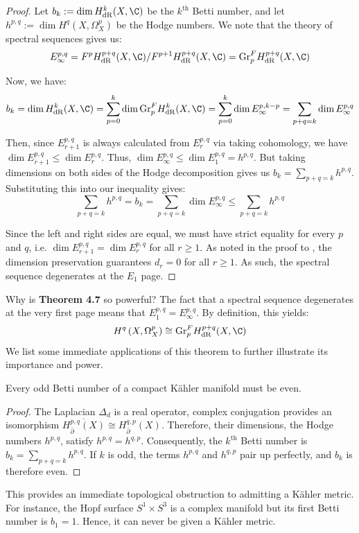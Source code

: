 \begin{proof}
        Let $b_k:=\dim H_\mathrm{dR}^k(X,\C)$ be the $k^\text{th}$ Betti number, and let $h^{p,q}:=\dim H^q\left(X,\Omega_X^p\right)$ be the Hodge numbers. We note that the theory of spectral sequences gives us:
        $$
        E_\infty^{p,q} = F^p H_\mathrm{dR}^{p+q}(X,\C) / F^{p+1} H_\mathrm{dR}^{p+q}(X,\C) = \mathrm{Gr}^F_p H_\mathrm{dR}^{p+q}(X,\C)
        $$
        
        \noindent Now, we have:
        $$
        b_k = \dim H_\mathrm{dR}^k(X,\C) = \sum_{p=0}^k\dim \mathrm{Gr}^F_p H_\mathrm{dR}^k(X,\C) = \sum_{p=0}^k\dim E^{p,k-p}_\infty = \sum_{p+q=k} \dim E_\infty^{p,q}
        $$
        
        \noindent Then, since $E_{r+1}^{p,q}$ is always calculated from $E_r^{p,q}$ via taking cohomology, we have $\dim E_{r+1}^{p,q} \leq \dim E_r^{p,q}$. Thus, $\dim E_\infty^{p,q} \leq \dim E_1^{p,q} = h^{p,q}$. But taking dimensions on both sides of the Hodge decomposition gives us $b_k = \sum_{p+q=k} h^{p,q}$. Substituting this into our inequality gives:
        $$
        \sum_{p+q=k} h^{p,q} = b_k = \sum_{p+q=k} \dim E_\infty^{p,q} \leq \sum_{p+q=k} h^{p,q}
        $$
        
        \noindent Since the left and right sides are equal, we must have strict equality for every $p$ and $q$, i.e. $\dim E_{r+1}^{p,q} = \dim E_r^{p,q}$ for all $r\geq 1$. As noted in the proof to \cite[Theorem 8.28]{VoisinI2002}, the dimension preservation guarantees $d_r = 0$ for all $r\geq 1$. As such, the spectral sequence degenerates at the $E_1$ page.
\end{proof}

\noindent Why is \textbf{Theorem 4.7} so powerful? The fact that a spectral sequence degenerates at the very first page means that $E_1^{p,q} = E_\infty^{p,q}$. By definition, this yields:
$$
H^q\left(X,\Omega_X^p\right) \cong \mathrm{Gr}^F_p H^{p+q}_\mathrm{dR}(X,\C)
$$
We list some immediate applications of this theorem to further illustrate its importance and power. 

\begin{corollary}
    Every odd Betti number of a compact K\"ahler manifold must be even.
\end{corollary}

\begin{proof}
    The Laplacian $\Delta_d$ is a real operator, complex conjugation provides an isomorphism $\overline{H_{\bar{\partial}}^{p,q}(X)} \cong H_{\bar{\partial}}^{q,p}(X)$. Therefore, their dimensions, the Hodge numbers $h^{p,q}$, satisfy $h^{p,q} = h^{q,p}$. Consequently, the $k^\text{th}$ Betti number is $b_k = \sum_{p+q=k} h^{p,q}$. If $k$ is odd, the terms $h^{p,q}$ and $h^{q,p}$ pair up perfectly, and $b_k$ is therefore even.
\end{proof}
\noindent This provides an immediate topological obstruction to admitting a K\"ahler metric. For instance, the Hopf surface $S^1 \times S^3$ is a complex manifold but its first Betti number is $b_1=1$. Hence, it can never be given a K\"ahler metric.

